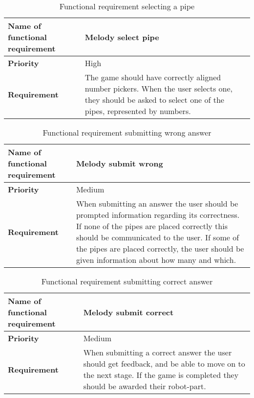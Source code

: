 \begin{table}[!h]
\caption{Functional requirement selecting a pipe}
\begin{tabular}{ |p{7cm}|p{7cm}| }
\hline
\textbf {Name of functional requirement} & {Melody select pipe} \\ \hline
\textbf {Priority} & {High} \\ \hline
\textbf {Requirement} & {The game should have correctly aligned number pickers. When the user selects one, they should be asked to select one of the pipes, represented by numbers.} \\ \hline
\end{tabular}
\end{table}

\begin{table}[!h]
\caption{Functional requirement submitting wrong answer}
\begin{tabular}{ |p{7cm}|p{7cm}| }
\hline
\textbf {Name of functional requirement} & {Melody submit wrong} \\ \hline
\textbf {Priority} & {Medium} \\ \hline
\textbf {Requirement} & {When submitting an answer the user should be prompted information regarding its correctness. If none of the pipes are placed correctly this should be communicated to the user. If some of the pipes are placed correctly, the user should be given information about how many and which.} \\ \hline
\end{tabular}
\end{table}

\begin{table}[!h]
\caption{Functional requirement submitting correct answer}
\begin{tabular}{ |p{7cm}|p{7cm}| }
\hline
\textbf {Name of functional requirement} & {Melody submit correct} \\ \hline
\textbf {Priority} & {Medium} \\ \hline
\textbf {Requirement} & {When submitting a correct answer the user should get feedback, and be able to move on to the next stage. If the game is completed they should be awarded their robot-part.} \\ \hline
\end{tabular}
\end{table}